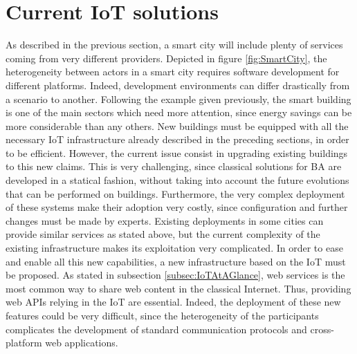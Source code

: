 \section{Current IoT solutions}
\label{sec:IoTOS}
As described in the previous section, a smart city will include plenty of services coming from very different providers.
Depicted in figure \ref{fig:SmartCity}, the heterogeneity between actors in a smart city requires software development for different platforms.
Indeed, development environments can differ drastically from a scenario to another.
Following the example given previously, the smart building is one of the main sectors which need more attention, since energy savings can be more considerable than any others.
New buildings must be equipped with all the necessary IoT infrastructure already described in the preceding sections, in order to be efficient.
However, the current issue consist in upgrading existing buildings to this new claims.
This is very challenging, since classical solutions for BA are developed in a statical fashion, without taking into account the future evolutions that can be performed on buildings.
Furthermore, the very complex deployment of these systems make their adoption very costly, since configuration and further changes must be made by experts.
Existing deployments in some cities can provide similar services as stated above, but the current complexity of the existing infrastructure makes its exploitation very complicated.
In order to ease and enable all this new capabilities, a new infrastructure based on the IoT must be proposed.
As stated in subsection \ref{subsec:IoTAtAGlance}, web services is the most common way to share web content in the classical Internet.
Thus, providing web APIs relying in the IoT are essential.
Indeed, the deployment of these new features could be very difficult, since the heterogeneity of the participants complicates the development of standard communication protocols and cross-platform web applications.




